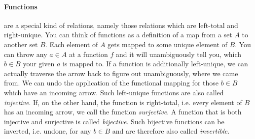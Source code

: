 



\paragraph{Functions} are a special kind of relations, namely those relations which are left-total and right-unique. You can think of functions as a definition of a map from a set $A$ to another set $B$. Each element of $A$ gets mapped to some unique element of $B$. You can throw any $a \in A$ at a function $f$ and it will unambiguously tell you, which $b \in B$ your given $a$ is mapped to. If a function is additionally left-unique, we can actually traverse the arrow back to figure out unambiguously, where we came from. We can undo the application of the functional mapping for those $b \in B$ which have an incoming arrow. Such left-unique functions are also called \emph{injective}. If, on the other hand, the function is right-total, i.e. every element of $B$ has an incoming arrow, we call the function \emph{surjective}. A function that is both injective and surjective is called \emph{bijective}. Such bijective functions can be inverted, i.e. undone, for any $b \in B$ and are therefore also called \emph{invertible}.


